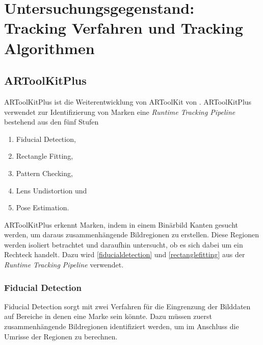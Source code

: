 \section{Untersuchungsgegenstand: Tracking Verfahren und Tracking Algorithmen} %
\label{sec:untersuchungsgegenstand}
\begin{comment}
	Untersuchungsgegenstand: Verfahren und Algorithmen präzise vorstellen und ihre Unterschiede hervorheben.
	Notwendige Kriterien der Algorithmen bestimmen

	Grober Ablauf der Verfahren:
	* Wer hats erfunden?
	* Wie ist das Verfahren aufgebaut (Algo in grob)
	* Welche Kriterien müssen erfüllt sein (monochrom, rgb eingabe)?
\end{comment}

\subsection{ARToolKitPlus} %
\label{sub:artoolkitplus}

ARToolKitPlus ist die Weiterentwicklung von ARToolKit von \citeauthor{wagner07b}. ARToolKitPlus verwendet zur
Identifizierung von Marken eine \textit{Runtime Tracking Pipeline} bestehend aus den fünf Stufen

\begin{enumerate}
	\item Fiducial Detection, \label{fiducialdetection}
	\item Rectangle Fitting, \label{rectanglefitting}
	\item Pattern Checking,
	\item Lens Undistortion und
	\item Pose Estimation.
\end{enumerate}

ARToolKitPlus erkennt Marken, indem in einem Binärbild Kanten gesucht werden, um daraus zusammenhängende Bildregionen
 zu erstellen. Diese Regionen werden isoliert betrachtet und daraufhin untersucht, ob es sich dabei um ein Rechteck
 handelt. Dazu wird \autoref{fiducialdetection} und \autoref{rectanglefitting} aus der
 \textit{Runtime Tracking Pipeline} verwendet.


\subsubsection{Fiducial Detection} %
\label{sub:fiducial_detection}

Fiducial Detection sorgt mit zwei Verfahren für die Eingrenzung der Bilddaten auf Bereiche in denen eine Marke sein könnte. Dazu müssen zuerst zusammenhängende Bildregionen identifiziert werden, um im Anschluss die Umrisse der Regionen zu berechnen.

